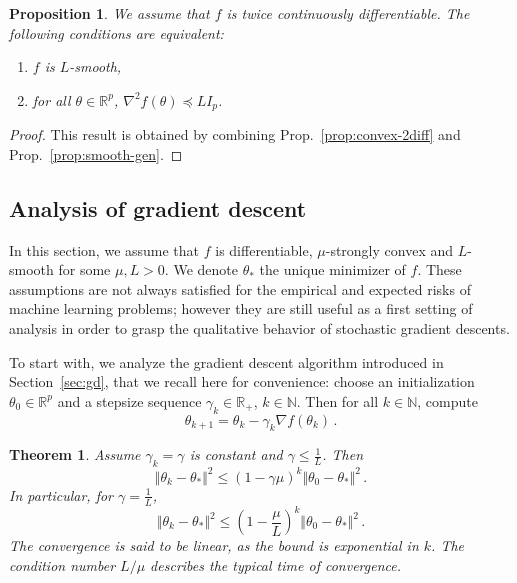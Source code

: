 \documentclass[11pt,reqno]{article}
\newcommand{\N}{\mathbb{N}}
\newcommand{\R}{\mathbb{R}}
\renewcommand{\leq}{\leqslant}
\numberwithin{equation}{section}
\theoremstyle{plain}
\newtheorem{proposition}[assumption]{Proposition}
\newtheorem{thm}[assumption]{Theorem}
\theoremstyle{definition}
\theoremstyle{remark}
\begin{document}
\begin{proposition}
	We assume that $f$ is twice continuously differentiable. The following conditions are equivalent:
	\begin{enumerate}[label=(\roman*)]
		\item $f$ is $L$-smooth,
		\item for all $\theta \in \R^p$, $\nabla^2 f(\theta) \preccurlyeq L I_p$.
	\end{enumerate}
\end{proposition}

\begin{proof}
	This result is obtained by combining Prop.~\ref{prop:convex-2diff} and Prop.~\ref{prop:smooth-gen}.
\end{proof}










\subsection{Analysis of gradient descent}
\label{sec:analysis-gd}

In this section, we assume that $f$ is differentiable, $\mu$-strongly convex and $L$-smooth for some $\mu, L > 0$. We denote $\theta_*$ the unique minimizer of $f$. These assumptions are not always satisfied for the empirical and expected risks of machine learning problems; however they are still useful as a first setting of analysis in order to grasp the qualitative behavior of stochastic gradient descents.

To start with, we analyze the gradient descent algorithm introduced in Section~\ref{sec:gd}, that we recall here for convenience: choose an initialization $\theta_0 \in \R^p$ and a stepsize sequence $\gamma_k \in \R_+$, $k \in \N$. Then for all $k \in \N$, compute 
\begin{equation*}
	\theta_{k+1} = \theta_k - \gamma_{k} \nabla f(\theta_k) \, .
\end{equation*}

\begin{thm}
	\label{thm:gd}
	Assume $\gamma_k = \gamma$ is constant and $\gamma \leq \frac{1}{L}$. Then \begin{equation*}
		\Vert \theta_k - \theta_* \Vert^2 \leq (1-\gamma \mu)^k \Vert \theta_0 - \theta_* \Vert^2 \, .
	\end{equation*}
	In particular, for $\gamma = \frac{1}{L}$, 
	\begin{equation*}
		\Vert \theta_k - \theta_* \Vert^2 \leq \left(1 - \frac{\mu}{L}\right)^k \Vert \theta_0 - \theta_* \Vert^2 \, .
	\end{equation*}
	The convergence is said to be \emph{linear}, as the bound is exponential in $k$. The condition number ${L}/{\mu}$ describes the typical time of convergence. 
\end{thm}
\end{document}
